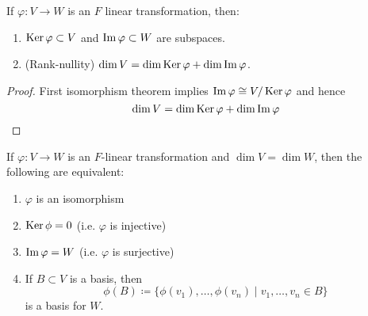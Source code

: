 \documentclass[../Main.tex]{subfiles}
\begin{document}
\begin{crl}
	If $\varphi\colon V\to W$ is an $F$ linear transformation, then:
	\begin{enumerate}[label = (\arabic*)]
		\item $\operatorname{Ker}\varphi\subset V$ and $\operatorname{Im}\varphi \subset W$ are subspaces.
		\item (Rank-nullity) $\dim V = \dim \operatorname{Ker} \varphi + \dim \operatorname{Im} \varphi$.
	\end{enumerate}
\end{crl}
\begin{proof}
	First isomorphism theorem implies $\operatorname{Im}\varphi \cong V/\operatorname{Ker}\varphi$ and hence
	\[\dim V = \dim \operatorname{Ker} \varphi + \dim \operatorname{Im} \varphi\]
\end{proof}
\begin{crl}
	If $\varphi\colon V\to W$ is an $F$-linear transformation and $\dim V = \dim W$, then the following are equivalent:
	\begin{enumerate}[label=(\arabic*)]
		\item $\varphi$ is an isomorphism
		\item $\operatorname{Ker}\phi = 0$ (i.e. $\varphi$ is injective)
		\item $\operatorname{Im}\varphi =W$ (i.e. $\varphi$ is surjective)
		\item If $B\subset V$ is a basis, then 
		\[\phi(B)\coloneqq  \{\phi(v_1),\dots,\phi(v_n)\mid v_1,\dots,v_n\in B \}\]
		is a basis for $W$.
	\end{enumerate}
\end{crl}
\end{document}
